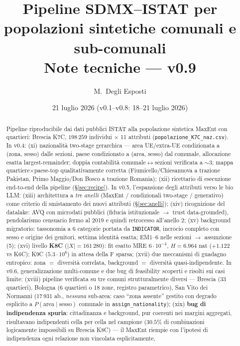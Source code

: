 \documentclass[11pt,a4paper]{article}
\title{\textbf{Pipeline SDMX--ISTAT per popolazioni sintetiche comunali e sub-comunali}\\[2mm]
\large Note tecniche --- v0.9}
\author{M.~Degli Esposti}
\date{21 luglio 2026 \quad (v0.1--v0.8: 18--21 luglio 2026)}
\newcommand{\code}[1]{\texttt{#1}}
\begin{document}
\maketitle

\begin{abstract}
\noindent
Pipeline riproducibile dai dati pubblici ISTAT alla popolazione sintetica
MaxEnt con quartieri: Brescia K7C, $198\,259$ individui $\times$ 11 attributi
(\code{popolazione\_K7C\_naz.csv}). In v0.4: (xi) nazionalit\`a two-stage
gerarchica --- area UE/extra-UE condizionata a (zona, sesso) dalle sezioni,
paese condizionato a (area, sesso) dal comunale, allocazione esatta
largest-remainder; doppia contabilit\`a comunale$\leftrightarrow$sezioni
verificata a $\sim3$\textperthousand; mappa quartiere$\times$paese-top
qualitativamente corretta (Fiumicello/Chiesanuova a trazione Pakistan,
Primo Maggio/Don Bosco a trazione Romania); (xii) ricettario di esecuzione
end-to-end della pipeline (\S\ref{sec:recipe}). In v0.5, l'espansione degli
attributi verso le bio LLM: (xiii) architettura a \emph{tre anelli}
(MaxEnt / condizionali two-stage / generativo) come criterio di smistamento
dei nuovi attributi (\S\ref{sec:anelli}); (xiv) ricognizione del datalake:
AVQ con microdati pubblici (fiducia istituzionale $\to$ trust data-grounded),
pendolarismo censuario fermo al 2019 e quindi retrocesso all'anello 2;
(xv) background migratorio: tassonomia a 6 categorie portata da
\code{INDICATOR}, incrocio completo con sesso e origine dei genitori,
settima identit\`a esatta; EM1--6 nelle sezioni $\to$ assunzione (5);
(xvi) livello \textbf{K8C} ($|X|=161\,280$): fit esatto MRE
$6\cdot10^{-4}$, $H=6.964$ nat ($+1.122$ vs K6C); K9C ($5.3\cdot10^6$)
in attesa della F sparsa; (xvii) due meccanismi di guadagno entropico:
zona $=$ diversit\`a correlata, background $=$ diversit\`a
quasi-indipendente. In v0.6, generalizzazione multi-comune e due bug di
feasibility scoperti e risolti sui casi limite: (xviii) pipeline verificata
su tre comuni strutturalmente diversi --- Brescia (33 quartieri), Bologna
(6 quartieri o 18 zone, registro parametrico), San Vito dei Normanni
(17\,931 ab., \emph{nessuna} sub-area: caso ``zona assente'' gestito con
degrado esplicito a $P(\text{area}\mid\text{sesso})$ comunale in
\code{assign\_nationality}); (xix) \textbf{bug di indipendenza spuria}:
cittadinanza e background, pur coerenti nei margini aggregati, risultavano
indipendenti cella per cella nel campione ($30.5\%$ di combinazioni
logicamente impossibili su Brescia K8C) --- il MaxEnt riempie con
l'ipotesi di indipendenza ogni relazione non vincolata esplicitamente,

\end{abstract}
\end{document}

